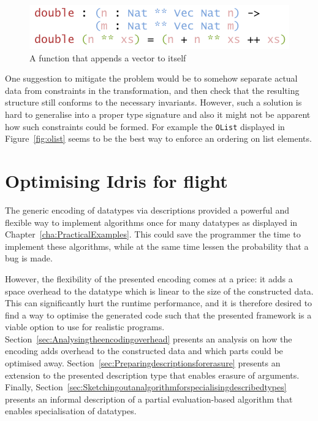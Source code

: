 \documentclass{ituthesis}
\newcommand{\tttype}[1]{\textcolor{type-color}{\texttt{#1}}}
\theoremstyle{break}
\begin{document}
\begin{figure}[ht]
\begin{center}
    \includegraphics[scale=0.5]{Figures/UniplateTransformCounterProofFunc.png}
\end{center}
\caption{A function that appends a vector to itself}
\label{fig:twovecfunc}
\end{figure}

One suggestion to mitigate the problem would be to somehow separate actual data from constraints in the transformation, and then check that the resulting structure still conforms to the necessary invariants.
However, such a solution is hard to generalise into a proper type signature and also it might not be apparent how such constraints could be formed.
For example the \tttype{OList} displayed in Figure~\ref{fig:olist} seems to be the best way to enforce an ordering on list elements.


\chapter{Optimising Idris for flight}
\label{cha:OptimizingIdrisforFlight}

The generic encoding of datatypes via descriptions provided a powerful and flexible way to implement algorithms once for many datatypes as displayed in Chapter~\ref{cha:PracticalExamples}.
This could save the programmer the time to implement these algorithms, while at the same time lessen the probability that a bug is made.

However, the flexibility of the presented encoding comes at a price: it adds a space overhead to the datatype which is linear to the size of the constructed data.
This can significantly hurt the runtime performance, and it is therefore desired to find a way to optimise the generated code such that the presented framework is a viable option to use for realistic programs.
Section~\ref{sec:Analysingtheencodingoverhead} presents an analysis on how the encoding adds overhead to the constructed data and which parts could be optimised away.
Section~\ref{sec:Preparingdescriptionsforerasure} presents an extension to the presented description type that enables erasure of arguments.
Finally, Section~\ref{sec:Sketchingoutanalgorithmforspecialisingdescribedtypes} presents an informal description of a partial evaluation-based algorithm that enables
specialisation of datatypes.
\end{document}
